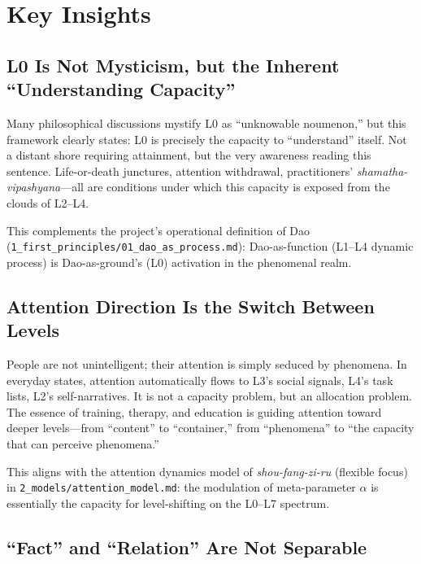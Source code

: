 \documentclass[11pt,a4paper]{article}
\begin{document}
\section{Key Insights}

\subsection{L0 Is Not Mysticism, but the Inherent ``Understanding Capacity''}

Many philosophical discussions mystify L0 as ``unknowable noumenon,'' but this framework clearly states: L0 is precisely the capacity to ``understand'' itself. Not a distant shore requiring attainment, but the very awareness reading this sentence. Life-or-death junctures, attention withdrawal, practitioners' \textit{shamatha-vipashyana}---all are conditions under which this capacity is exposed from the clouds of L2--L4.

This complements the project's operational definition of Dao (\texttt{1\_first\_principles/01\_dao\_as\_process.md}): Dao-as-function (L1--L4 dynamic process) is Dao-as-ground's (L0) activation in the phenomenal realm.

\subsection{Attention Direction Is the Switch Between Levels}

People are not unintelligent; their attention is simply seduced by phenomena. In everyday states, attention automatically flows to L3's social signals, L4's task lists, L2's self-narratives. It is not a capacity problem, but an allocation problem. The essence of training, therapy, and education is guiding attention toward deeper levels---from ``content'' to ``container,'' from ``phenomena'' to ``the capacity that can perceive phenomena.''

This aligns with the attention dynamics model of \textit{shou-fang-zi-ru} (flexible focus) in \texttt{2\_models/attention\_model.md}: the modulation of meta-parameter $\alpha$ is essentially the capacity for level-shifting on the L0--L7 spectrum.

\subsection{``Fact'' and ``Relation'' Are Not Separable}
\end{document}
